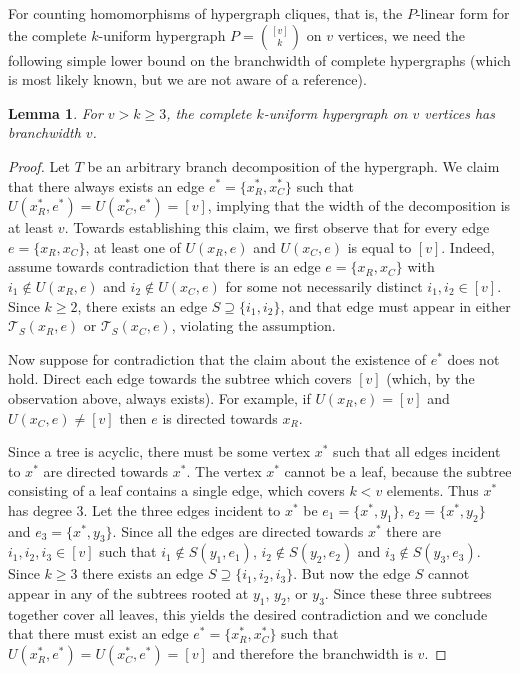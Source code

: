 \documentclass[11pt]{article}
\numberwithin{equation}{section}
\newtheorem{lemma}[theorem]{Lemma}
\theoremstyle{definition}
\theoremstyle{plain}
\newcommand{\ts}{\ensuremath{\mathcal{T}_S}}
\begin{document}
For counting homomorphisms of hypergraph cliques, that is,
the $P$-linear form for the complete $k$-uniform hypergraph
$P=\binom{[v]}{k}$ on $v$ vertices, we need the
following simple lower bound on the branchwidth of complete
hypergraphs (which is most likely known, but we are not aware of a
reference).

\begin{lemma}
  For $v > k \ge 3$, the complete $k$-uniform hypergraph on $v$ vertices has branchwidth $v$.
\end{lemma}

\begin{proof}
  Let $T$ be an arbitrary branch decomposition of the hypergraph.
We claim that there always
exists an edge $e^* = \{x^*_R, x^*_C\}$ such that $U(x^*_R, e^*) = U(x^*_C, e^*) = [v]$, implying that the width of the decomposition is at least $v$.
Towards establishing this claim, we first observe that for every edge $e = \{x_R, x_C\}$,
at least one of
  $U(x_R, e)$ and $U(x_C, e)$ is equal to $[v]$. Indeed, assume towards contradiction
  that there is an edge $e = \{x_R, x_C\}$ with
  $i_1 \not\in U(x_R, e)$ and $i_2 \not\in U(x_C, e)$ for some not
  necessarily distinct $i_1, i_2 \in [v]$.  Since $k \ge 2$, there exists
  an edge $S \supseteq \{i_1, i_2\}$, and that edge must appear in
  either $\ts(x_R, e)$  or $\ts(x_C,  e)$, violating the assumption.

  Now suppose for contradiction that the claim about the existence of $e^*$ does not hold.
  Direct each edge towards the subtree which covers $[v]$ (which, by the observation above, always exists).  For
  example, if $U(x_R, e) = [v]$ and $U(x_C, e) \ne [v]$ then $e$ is
  directed towards $x_R$.

   Since a tree is acyclic, there must be some vertex $x^*$ such that
  all edges incident to $x^*$ are directed towards $x^*$.  The vertex
  $x^*$ cannot be a leaf, because the subtree consisting of a leaf
  contains a single edge, which covers $k < v$ elements.  Thus $x^*$
  has degree $3$.  Let the three edges incident to $x^*$ be $e_1 =
  \{x^*, y_1\}$, $e_2 = \{x^*, y_2\}$ and $e_3 = \{x^*, y_3\}$.  Since
  all the edges are directed towards $x^*$ there are $i_1, i_2, i_3
  \in [v]$ such that $i_1 \not\in S(y_1, e_1)$, $i_2 \not\in S(y_2,
  e_2)$ and $i_3 \not\in S(y_3, e_3)$.  Since $k \ge 3$ there exists an
  edge $S \supseteq \{i_1,i_2,i_3\}$.  But now the edge $S$ cannot appear in any of the subtrees rooted at $y_1$, $y_2$, or $y_3$.
  Since these three subtrees together cover all leaves, this yields
  the desired contradiction and we conclude that there must exist an
  edge $e^* = \{x^*_R, x^*_C\}$ such that $U(x^*_R, e^*) = U(x^*_C, e^*) = [v]$
  and therefore the branchwidth is $v$.
\end{proof}
\end{document}
